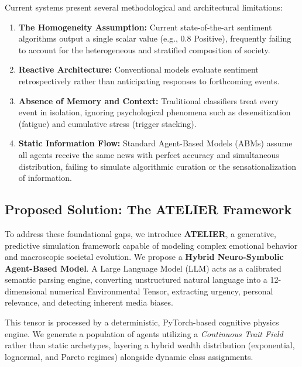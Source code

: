 \documentclass[12pt]{IEEEtran}
\begin{document}
Current systems present several methodological and architectural limitations:
\begin{enumerate}
    \item \textbf{The Homogeneity Assumption:} Current state-of-the-art sentiment algorithms output a single scalar value (e.g., $0.8$ Positive), frequently failing to account for the heterogeneous and stratified composition of society.
    \item \textbf{Reactive Architecture:} Conventional models evaluate sentiment retrospectively rather than anticipating responses to forthcoming events.
    \item \textbf{Absence of Memory and Context:} Traditional classifiers treat every event in isolation, ignoring psychological phenomena such as desensitization (fatigue) and cumulative stress (trigger stacking).
    \item \textbf{Static Information Flow:} Standard Agent-Based Models (ABMs) assume all agents receive the same news with perfect accuracy and simultaneous distribution, failing to simulate algorithmic curation or the sensationalization of information.
\end{enumerate}

\subsection{Proposed Solution: The ATELIER Framework}
To address these foundational gaps, we introduce \textbf{ATELIER}, a generative, predictive simulation framework capable of modeling complex emotional behavior and macroscopic societal evolution. We propose a \textbf{Hybrid Neuro-Symbolic Agent-Based Model}. A Large Language Model (LLM) acts as a calibrated semantic parsing engine, converting unstructured natural language into a 12-dimensional numerical Environmental Tensor, extracting urgency, personal relevance, and detecting inherent media biases.

This tensor is processed by a deterministic, PyTorch-based cognitive physics engine. We generate a population of agents utilizing a \textit{Continuous Trait Field} rather than static archetypes, layering a hybrid wealth distribution (exponential, lognormal, and Pareto regimes) alongside dynamic class assignments.
\end{document}
